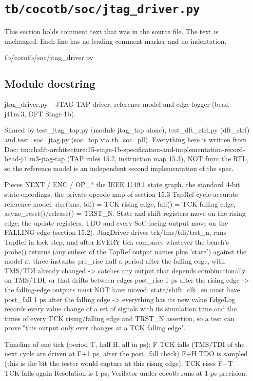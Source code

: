 \section{\texttt{tb/cocotb/soc/jtag\_driver.py}}\label{tm:suite:soc-jtag-driver}

This section holds comment text that was in the source file. The text is unchanged. Each line has no leading comment marker and no indentation.

\begin{relocated}{tb/cocotb/soc/jtag_driver.py}

\subsection*{Module docstring}

\begin{textblock}
jtag_driver.py -- JTAG TAP driver, reference model and edge logger (bead j41m.3, DFT Stage 1b).

Shared by test_jtag_tap.py (module jtag_tap alone), test_dft_ctrl.py (dft_ctrl) and
test_soc_jtag.py (soc_top via tb_soc_pll).  Everything here is written from
Doc: tm:ch:dft-architecture:15-stage-1b-specification-and-implementation-record-bead-j41m3-jtag-tap (TAP rules 15.2, instruction map 15.3), NOT from the RTL,
so the reference model is an independent second implementation of the spec.

Pieces
NEXT / ENC / OP_*      the IEEE 1149.1 state graph, the standard 4-bit state encodings, the
private opcode map of section 15.3
TapRef                 cycle-accurate reference model: rise(tms, tdi) = TCK rising edge,
fall() = TCK falling edge, async_reset()/release() = TRST_N.  State and
shift registers move on the rising edge; the update registers, TDO and
every SoC-facing output move on the FALLING edge (section 15.2).
JtagDriver             drives tck/tms/tdi/trst_n, runs TapRef in lock step, and after EVERY tick
compares whatever the bench's probe() returns (any subset of the TapRef
output names plus 'state') against the model at three instants:
pre_rise   half a period after the falling edge, with TMS/TDI already
changed  -> catches any output that depends combinationally
on TMS/TDI, or that drifts between edges
post_rise  1 ps after the rising edge -> the falling-edge outputs must
NOT have moved; state/shift_clk_en must have
post_fall  1 ps after the falling edge -> everything has its new value
EdgeLog                records every value change of a set of signals with its simulation time and
the times of every TCK rising/falling edge and TRST_N assertion, so a test
can prove "this output only ever changes at a TCK falling edge".

Timeline of one tick (period T, half H, all in ps):
F   TCK falls (TMS/TDI of the next cycle are driven at F+1 ps, after the post_fall check)
F+H TDO is sampled (this is the bit the tester would capture at this rising edge), TCK rises
F+T TCK falls again
Resolution is 1 ps; Verilator under cocotb runs at 1 ps precision.
\end{textblock}

\end{relocated}


